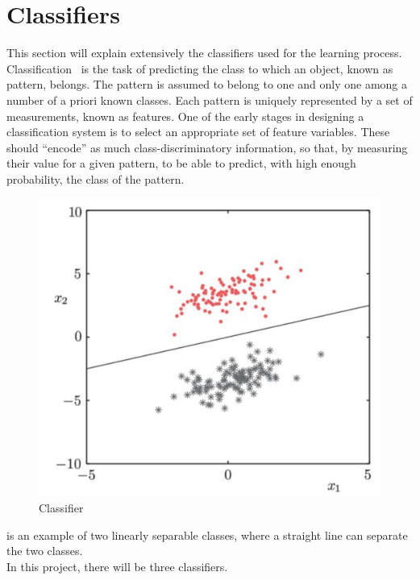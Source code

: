 \section{Classifiers}
\label{sec:clasif}
This section will explain extensively the classifiers used for the learning process.\\
Classification~\cite{classif} is the task of predicting the class to which an object, known as pattern, belongs. The pattern is assumed to belong to one and only one among a number of a priori known classes. Each pattern is uniquely represented by a set of measurements, known as features. One of the early stages in designing a classification system is to select an appropriate set of feature variables. These should “encode” as much class-discriminatory information, so that, by measuring their value for a given pattern, to be able to predict, with high enough probability, the class of the pattern. 
\begin{figure}
	\includegraphics[width=\linewidth]{img/classifier.png}
	\caption{Classifier~\cite{classif}}
	\label{fig:classifier}
\end{figure}
 is an example of two linearly separable classes, where a straight line can separate the two classes. \\
In this project, there will be three classifiers.
